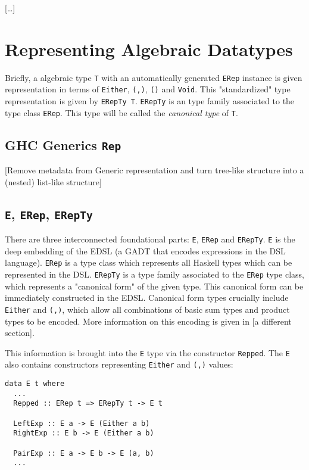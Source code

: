 \documentclass[sigplan,screen]{acmart}
\newcommand{\ttt}{\texttt}
\begin{document}
[\ldots]

\section{Representing Algebraic Datatypes}

Briefly, a algebraic type \ttt{T} with an automatically generated \ttt{ERep}
instance is given representation in terms of \ttt{Either}, \ttt{(,)},
\ttt{()} and \ttt{Void}. This "standardized" type representation is
given by \ttt{ERepTy T}. \ttt{ERepTy} is an type family associated to
the type class \ttt{ERep}. This type will be called the \textit{canonical type}
of \ttt{T}.

\subsection{GHC Generics \ttt{Rep}}

[Remove metadata from Generic representation and turn tree-like structure into a (nested) list-like structure]

\subsection{\ttt{E}, \ttt{ERep}, \ttt{ERepTy}}

There are three interconnected foundational parts: \ttt{E}, \ttt{ERep} and
\ttt{ERepTy}. \ttt{E} is the deep embedding of the EDSL (a GADT that encodes
expressions in the DSL language). \ttt{ERep} is a type class which represents
all Haskell types which can be represented in the DSL. \ttt{ERepTy} is a type
family associated to the \ttt{ERep} type class, which represents a "canonical form"
of the given type. This canonical form can be immediately constructed in the EDSL.
Canonical form types crucially include \ttt{Either} and \ttt{(,)}, which
allow all combinations of basic sum types and product types to be encoded. More
information on this encoding is given in [a different section].

This information is brought into the \ttt{E} type via the constructor
\ttt{Repped}. The \ttt{E} also contains constructors representing \ttt{Either}
and \ttt{(,)} values:

\begin{lstlisting}
data E t where
  ...
  Repped :: ERep t => ERepTy t -> E t

  LeftExp :: E a -> E (Either a b)
  RightExp :: E b -> E (Either a b)

  PairExp :: E a -> E b -> E (a, b)
  ...
\end{lstlisting}
\end{document}
